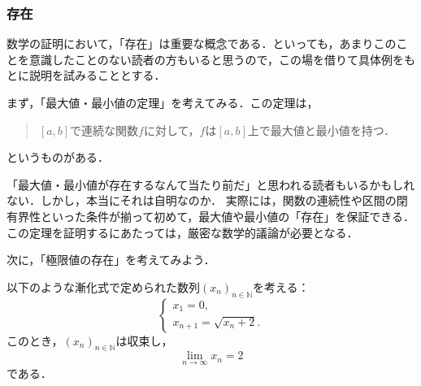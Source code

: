 \documentclass[a4paper,11pt]{ltjsarticle}
\begin{document}
\subsubsection{存在}



数学の証明において，「存在」は重要な概念である．といっても，あまりこのことを意識したことのない読者の方もいると思うので，この場を借りて具体例をもとに説明を試みることとする．

まず，「最大値・最小値の定理」を考えてみる．この定理は，
\begin{quotation}
  $[a,b]$で連続な関数$f$に対して，$f$は$[a,b]$上で最大値と最小値を持つ．
\end{quotation}
というものがある．

「最大値・最小値が存在するなんて当たり前だ」と思われる読者もいるかもしれない．しかし，本当にそれは自明なのか．
実際には，関数の連続性や区間の閉有界性といった条件が揃って初めて，最大値や最小値の「存在」を保証できる．この定理を証明するにあたっては，厳密な数学的議論が必要となる．

次に，「極限値の存在」を考えてみよう．

\begin{prop}{}{}
  以下のような漸化式で定められた数列$(x_n)_{n \in \mathbb{N}}$を考える：
  \[
    \begin{cases}
      x_1 =0 , \\
      x_{n+1}= \sqrt{x_n+2}.
    \end{cases}
  \]
  このとき，$(x_n)_{n \in \mathbb{N}}$は収束し，
  \[
    \lim_{n \to \infty} x_n =2
  \]
  である．
\end{prop}
\end{document}
